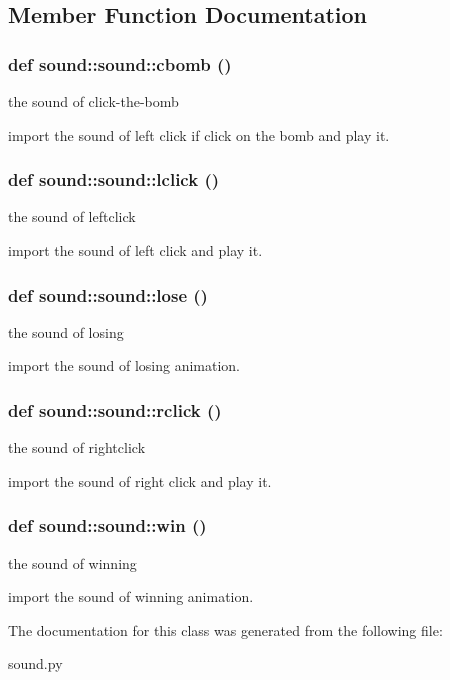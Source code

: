 \subsection{Member Function Documentation}
\subsubsection{\setlength{\rightskip}{0pt plus 5cm}def sound::sound::cbomb ()}\label{classsound_1_1sound_37d94f9d727f243a1d6e3e084051fc8b}


the sound of click-the-bomb 

import the sound of left click if click on the bomb and play it. 
\subsubsection{\setlength{\rightskip}{0pt plus 5cm}def sound::sound::lclick ()}\label{classsound_1_1sound_f4bb2214604d8c18c9e8e27343a658ca}


the sound of leftclick 

import the sound of left click and play it. 
\subsubsection{\setlength{\rightskip}{0pt plus 5cm}def sound::sound::lose ()}\label{classsound_1_1sound_aa3894a3ed91a0c062173281e236b93d}


the sound of losing 

import the sound of losing animation. 
\subsubsection{\setlength{\rightskip}{0pt plus 5cm}def sound::sound::rclick ()}\label{classsound_1_1sound_b6a3a2157f0a3212b139410099fdd66b}


the sound of rightclick 

import the sound of right click and play it. 
\subsubsection{\setlength{\rightskip}{0pt plus 5cm}def sound::sound::win ()}\label{classsound_1_1sound_5475c71500deb678eea05e5484e9c1e1}


the sound of winning 

import the sound of winning animation. 

The documentation for this class was generated from the following file:\begin{CompactItemize}
\item 
sound.py\end{CompactItemize}
